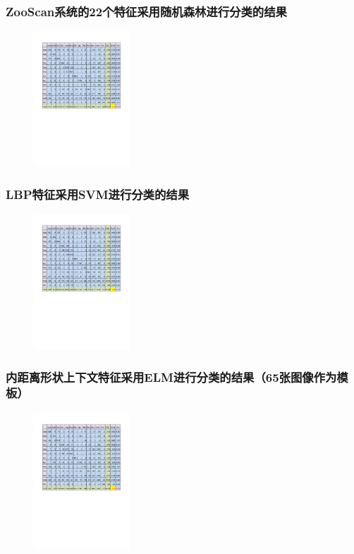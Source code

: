 \documentclass[notheorems,mathserif,table,compress]{beamer}  %
\begin{document}
\begin{frame}
\frametitle{ZooScan系统的22个特征采用随机森林进行分类的结果}
\begin{figure}[!ht]
\centering
\includegraphics[width=1.0\linewidth,height=2in]{22Features-RF.pdf}
\end{figure}

\centering
\color{red} 
\end{frame}
\begin{frame}
\frametitle{LBP特征采用SVM进行分类的结果}
\begin{figure}[!ht]
\centering
\includegraphics[width=1.0\linewidth,height=2in]{LBP-SVM-2-folds-5-repetitions-32-256.pdf}
\end{figure}

\centering
\color{red} 
\end{frame}
\begin{frame}
\frametitle{内距离形状上下文特征采用ELM进行分类的结果（65张图像作为模板）}
\begin{figure}[!ht]
\centering
\includegraphics[width=1.0\linewidth,height=2in]{IDSC-65-Features-MATLAB-ELM.pdf}
\end{figure}

\centering
\color{red} 
\end{frame}
\end{document}
